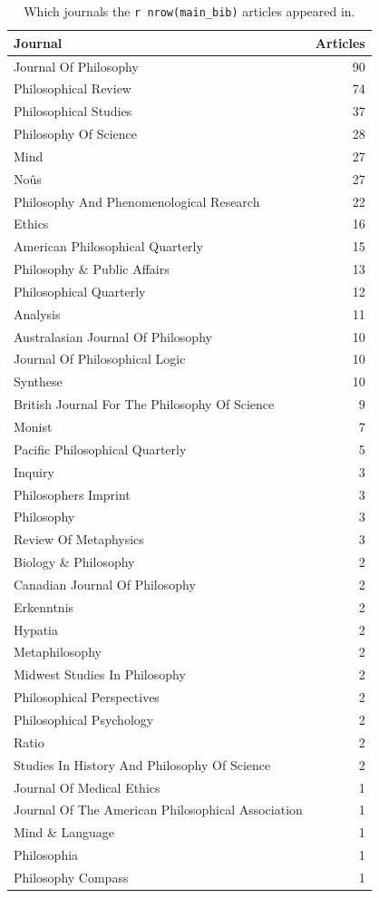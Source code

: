 \documentclass[
  10pt,
  letterpaper,
  DIV=11,
  numbers=noendperiod,
  twoside]{scrartcl}
\begin{document}
\begin{longtable}[]{@{}lr@{}}

\caption{\label{tbl-journals-in-main-bib}Which journals the
\texttt{r\ nrow(main\_bib)} articles appeared in.}

\tabularnewline

\toprule\noalign{}
Journal & Articles \\
\midrule\noalign{}
\endhead
\bottomrule\noalign{}
\endlastfoot
Journal Of Philosophy & 90 \\
Philosophical Review & 74 \\
Philosophical Studies & 37 \\
Philosophy Of Science & 28 \\
Mind & 27 \\
Noûs & 27 \\
Philosophy And Phenomenological Research & 22 \\
Ethics & 16 \\
American Philosophical Quarterly & 15 \\
Philosophy \& Public Affairs & 13 \\
Philosophical Quarterly & 12 \\
Analysis & 11 \\
Australasian Journal Of Philosophy & 10 \\
Journal Of Philosophical Logic & 10 \\
Synthese & 10 \\
British Journal For The Philosophy Of Science & 9 \\
Monist & 7 \\
Pacific Philosophical Quarterly & 5 \\
Inquiry & 3 \\
Philosophers Imprint & 3 \\
Philosophy & 3 \\
Review Of Metaphysics & 3 \\
Biology \& Philosophy & 2 \\
Canadian Journal Of Philosophy & 2 \\
Erkenntnis & 2 \\
Hypatia & 2 \\
Metaphilosophy & 2 \\
Midwest Studies In Philosophy & 2 \\
Philosophical Perspectives & 2 \\
Philosophical Psychology & 2 \\
Ratio & 2 \\
Studies In History And Philosophy Of Science & 2 \\
Journal Of Medical Ethics & 1 \\
Journal Of The American Philosophical Association & 1 \\
Mind \& Language & 1 \\
Philosophia & 1 \\
Philosophy Compass & 1 \\

\end{longtable}
\end{document}
